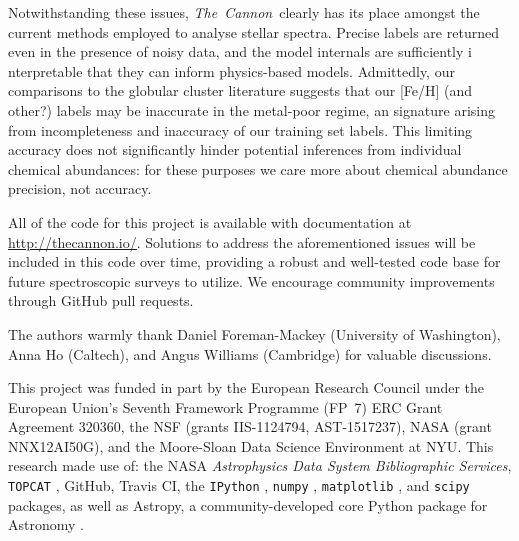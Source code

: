 \documentclass[12pt,preprint]{aastex}
\newcommand{\project}[1]{\textsl{#1}}
\newcommand{\TheCannon}{\project{The~Cannon}}
\newcommand{\acronym}[1]{{\small{#1}}}
\begin{document}
Notwithstanding these issues, \TheCannon\ clearly has its place amongst
the current methods employed to analyse stellar spectra.  Precise labels
are returned even in the presence of noisy data, and the model internals
are sufficiently i nterpretable that they can inform physics-based models.
Admittedly, our comparisons to the globular cluster literature suggests
that our [Fe/H] (and other?) labels may be inaccurate in the metal-poor
regime, an signature arising from incompleteness and inaccuracy of our
training set labels.  This limiting accuracy does not significantly
hinder potential inferences from individual chemical abundances: for
these purposes we care more about chemical abundance precision, not
accuracy.




All of the code for this project is available with documentation at \url{http://thecannon.io/}.  Solutions to address the aforementioned issues will be
included in this code over time, providing a robust and well-tested code base for 
future spectroscopic surveys to utilize.  We encourage community 
improvements through GitHub pull requests.








\acknowledgements
The authors warmly thank Daniel Foreman-Mackey (University of Washington),
						 Anna Ho (Caltech), and
						 Angus Williams (Cambridge) for valuable discussions.
						 
This project was funded in part by
  the European Research Council under the European Union's Seventh Framework 
  Programme (FP~7) \acronym{ERC} Grant Agreement 320360,
  the \acronym{NSF} (grants \acronym{IIS-1124794}, \acronym{AST-1517237}),
  \acronym{NASA} (grant \acronym{NNX12AI50G}), and 
  the Moore-Sloan Data Science Environment at \acronym{NYU}.
This research made use of: 
  the \acronym{NASA} \project{Astrophysics Data System Bibliographic Services},
  \texttt{TOPCAT} \citep{Taylor_2005},
  GitHub, 
  Travis CI, the
  \texttt{IPython} \citep{Perez_2007}, 
  \texttt{numpy} \citep{van_der_Walt_2011}, 
  \texttt{matplotlib} \citep{Hunter_2007}, and
  \texttt{scipy} \citep{Jones_2001} packages, as well as
  Astropy, a community-developed core Python package for Astronomy \citep{astropy}.
\end{document}
